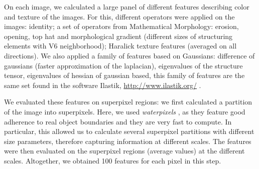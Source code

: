 \documentclass[a4paper,10pt]{article}
\begin{document}
On each image, we calculated a large panel of different features describing color
and texture of the images. For this, different operators were applied
on the images: identity; a set of operators from Mathematical
Morphology: erosion, opening, top hat and morphological gradient (different
sizes of structuring elements with V6 neighborhood); Haralick texture
features (averaged on all directions). We also applied a family of features based
on Gaussians: difference of gaussians (faster approximation of the
laplacian), eigenvalues of the structure tensor, eigenvalues of
hessian of gaussian based, this family of features are the same set found in the software Ilastik, \url{http://www.ilastik.org/} \citep{Ilastik}.

We evaluated these features on superpixel regions: we first calculated
a partition of the image into superpixels. Here, we used
\textit{waterpixels} \citep{waterpixels}, as they feature good
adherence to real object boundaries and they are very fast to
compute.  In particular, this allowed us to calculate several
superpixel partitions with different size parameters, therefore capturing
information at different scales. The features were then evaluated on
the superpixel regions (average values) at the different
scales. Altogether, we obtained 100 features for each pixel in this step. 

%
%
\end{document}
